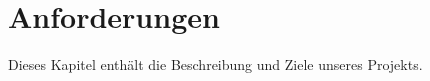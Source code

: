 \chapter{Anforderungen}
\label{chap:Anforderungen}

Dieses Kapitel enthält die Beschreibung und Ziele unseres Projekts.





